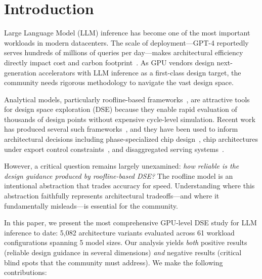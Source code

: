 \documentclass[sigconf,10pt]{acmart}
\begin{document}
\section{Introduction}
\label{sec:intro}

Large Language Model (LLM) inference has become one of the most important
workloads in modern datacenters. The scale of deployment---GPT-4 reportedly
serves hundreds of millions of queries per day---makes architectural
efficiency directly impact cost and carbon
footprint~\cite{stojkovic2024greener,llmco2}. As GPU vendors design
next-generation accelerators with LLM inference as a first-class design
target, the community needs rigorous methodology to navigate the vast
design space.

Analytical models, particularly roofline-based
frameworks~\cite{williams2009roofline,verhelst2025rooflines}, are
attractive tools for design space exploration (DSE) because they enable
rapid evaluation of thousands of design points without expensive cycle-level
simulation. Recent work has produced several such
frameworks~\cite{llmcompass,pope2023efficiently,zigzag2021}, and they
have been used to inform architectural decisions including
phase-specialized chip design~\cite{spad2025}, chip architectures under
export control constraints~\cite{ning2025sanctions}, and disaggregated
serving systems~\cite{splitwise2024,distserve2024}.

However, a critical question remains largely unexamined: \emph{how
reliable is the design guidance produced by roofline-based DSE?} The
roofline model is an intentional abstraction that trades accuracy for
speed. Understanding where this abstraction faithfully represents
architectural tradeoffs---and where it fundamentally misleads---is
essential for the community.

In this paper, we present the most comprehensive GPU-level DSE study for
LLM inference to date: 5,082 architecture variants evaluated across
61 workload configurations spanning 5 model sizes. Our analysis yields
\emph{both} positive results (reliable design guidance in several
dimensions) \emph{and} negative results (critical blind spots that the
community must address). We make the following contributions:
\end{document}
